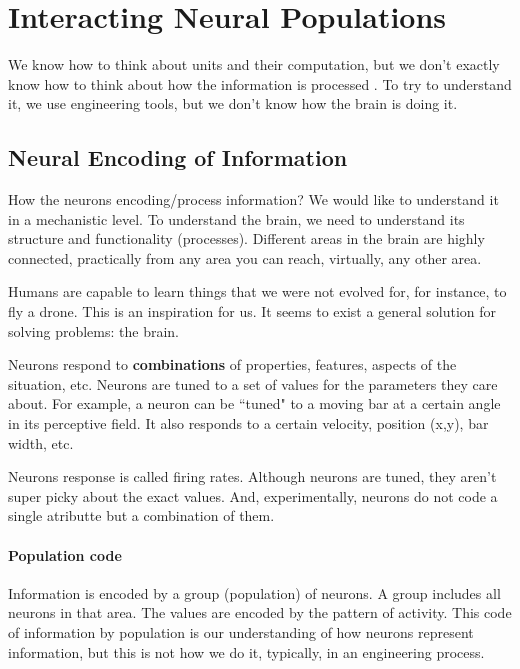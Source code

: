 \documentclass[main]{subfiles}
\begin{document}

\section{Interacting Neural Populations}

We know how to think about units and their computation, but we don't exactly know how to think about how the information is processed .
To try to understand it, we use engineering tools, but we don't know how the brain is doing it.

\subsection{Neural Encoding of Information}

How the neurons encoding/process information?
We would like to understand it in a mechanistic level.
To understand the brain, we need to understand its structure and functionality (processes).
Different areas in the brain are highly connected, practically from any area you can reach, virtually, any other area.

Humans are capable to learn things that we were not evolved for, for instance, to fly a drone.
This is an inspiration for us.
It seems to exist a general solution for solving problems: the brain.

Neurons respond to \textbf{combinations} of properties, features, aspects of the situation, etc.
Neurons are tuned to a set of values for the parameters they care about.
For example, a neuron can be ``tuned" to a moving bar at a certain angle in its perceptive field. It also responds to a certain velocity, position (x,y), bar width, etc.

Neurons response is called firing rates.
Although neurons are tuned, they aren't super picky about the exact values.
And, experimentally, neurons do not code a single atributte but a combination of them.

\paragraph{Population code}

Information is encoded by a group (population) of neurons.
A group includes all neurons in that area.
The values are encoded by the pattern of activity.
This code of information by population is our understanding of how neurons represent information, but this is not how we do it, typically, in an engineering process.
\end{document}
